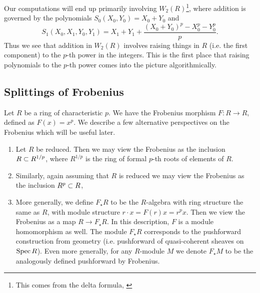 \begin{rmk}
	\label{rmk:polyraise:w2}
    Our computations will end up primarily involving
    \(W_{2}(R)\)\footnote{
    This comes from the delta formula,
    \cite[Theorem~D]{kty-2022-fedder}},
    where addition is governed by the polynomials
	\(S_{0}(X_{0}, Y_{0}) = X_{0} + Y_{0}\)
	and
	\[
		S_{1}(X_{0}, X_{1}, Y_{0}, Y_{1})
		= X_{1} + Y_{1} + 
		\frac{(X_{0} + Y_{0})^{p} - X_{0}^{p} - Y_{0}^{p}}{p}
	.\] 
	Thus we see that addition in \(W_{2}(R)\) involves raising 
	things in \(R\) (i.e. the first component) to the \(p\)-th
	power in the integers.
	This is the first place that raising polynomials
	to the \(p\)-th power comes into the picture 
	algorithmically.
\end{rmk}




\subsection{Splittings of Frobenius}

Let \(R\) be a ring of characteristic \(p\). 
We have the Frobenius morphism 
\(F \colon R \xrightarrow{} R\), 
defined as \(F(x) = x^p\).
We describe a few alternative perspectives on
the Frobenius which will be useful later.

\begin{rmk}
	\label{rmk:frob:perspectives}

    \begin{enumerate}[(1)]
    	\item Let \(R\) be reduced. 
    		Then we may view the Frobenius as the inclusion
    		\(R \subset R^{1 / p}\), where \(R^{1 / p}\) 
    		is the ring of formal \(p\)-th roots of elements
    		of \(R\).
    	\item Similarly, again assuming that \(R\) is reduced
    		we may view the Frobenius as the inclusion
    		\(R^{p} \subset R\), 
    	\item More generally, we define \(F_{\star}R\) to
			be the \(R\)-algebra with ring structure 
			the same as \(R\), with module structure
			\(r \cdot x = F(r)x = r^{p}x\).
			Then we view the Frobenius as a map
			\(R \xrightarrow{} F_{\star}R\).
			In this description, \(F\) is a module 
			homomorphism as well. 
			The module \(F_{\star}R\) corresponds to the
			pushforward construction from geometry
			(i.e. pushforward of quasi-coherent
			sheaves on \(\operatorname{Spec} R\)).
			Even more generally, for any \(R\)-module
			\(M\) we denote \(F_{\star}M\) to be
			the analogously defined pushforward by
			Frobenius.
    \end{enumerate}
\end{rmk}

